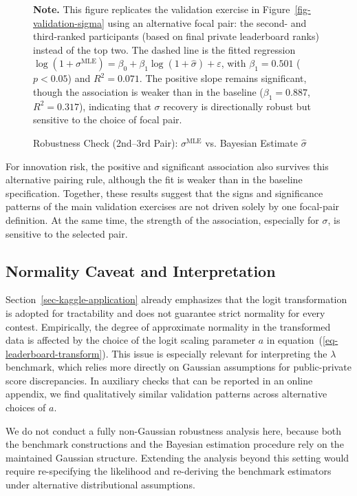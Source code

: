 \documentclass[mnsc]{informs3}
\begin{document}
\begin{figure}[tbp]
\caption{Robustness Check (2nd--3rd Pair): $\sigma^{\text{MLE}}$ vs. Bayesian Estimate $\hat\sigma$}
\label{fig-validation-sigma-robust23}
\begin{minipage}{\textwidth}
{\footnotesize
\textbf{Note.} This figure replicates the validation exercise in Figure~\ref{fig-validation-sigma} using an alternative focal pair: the second- and third-ranked participants (based on final private leaderboard ranks) instead of the top two. The dashed line is the fitted regression $\log(1 + \sigma^{\mathrm{MLE}}) = \beta_0 + \beta_1 \log(1 + \hat{\sigma}) + \varepsilon$, with $\beta_1 = 0.501$ ($p < 0.05$) and $R^2 = 0.071$. The positive slope remains significant, though the association is weaker than in the baseline ($\beta_1 = 0.887$, $R^2 = 0.317$), indicating that $\sigma$ recovery is directionally robust but sensitive to the choice of focal pair.
}
\end{minipage}
\end{figure}

For innovation risk, the positive and significant association also survives this alternative pairing rule, although the fit is weaker than in the baseline specification.
Together, these results suggest that the signs and significance patterns of the main validation exercises are not driven solely by one focal-pair definition. At the same time, the strength of the association, especially for $\sigma$, is sensitive to the selected pair.


\subsection{Normality Caveat and Interpretation}\label{sect-robust-normality}

Section~\ref{sec-kaggle-application} already emphasizes that the logit transformation is adopted for tractability and does not guarantee strict normality for every contest.
Empirically, the degree of approximate normality in the transformed data is affected by the choice of the logit scaling parameter $a$ in equation~(\ref{eq-leaderboard-transform}).
This issue is especially relevant for interpreting the $\lambda$ benchmark, which relies more directly on Gaussian assumptions for public-private score discrepancies.
In auxiliary checks that can be reported in an online appendix, we find qualitatively similar validation patterns across alternative choices of $a$.

We do not conduct a fully non-Gaussian robustness analysis here, because both the benchmark constructions and the Bayesian estimation procedure rely on the maintained Gaussian structure.
Extending the analysis beyond this setting would require re-specifying the likelihood and re-deriving the benchmark estimators under alternative distributional assumptions.
\end{document}

